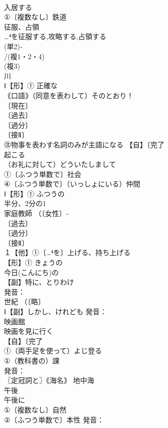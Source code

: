 \documentclass[8pt]{extreport}
\begin{document}
\begin{CJK}{UTF8}{min}
\\	入居する 
\\	①〔複数なし〕鉄道 
\\	征服、占領 
\\	…⁴を征服する,攻略する,占領する
\\	(単2)‐
\\	/(複1・2・4)
\\	(複3)
\\	川 
\\	Ⅰ【形】① 正確な 
\\	｟口語｠（同意を表わして）そのとおり！
\\	〔現在〕
\\	〔過去〕
\\	〔過分〕
\\	〔接Ⅱ〕
\\	㊟物事を表わす名詞のみが主語になる 【自】〔完了
\\	起こる 
\\	（お礼に対して）どういたしまして
\\	①〔ふつう単数で〕社会 
\\	④〔ふつう単数で〕（いっしょにいる）仲間
\\	Ⅰ【形】① ふつうの 
\\	半分、2分の1 
\\	家庭教師 （〔女性〕‐
\\	〔過去〕
\\	〔過分〕
\\	〔接Ⅱ〕
\\	１【他】①〔…⁴を〕上げる、持ち上げる 
\\	【形】① きょうの　　
\\	今日(こんにち)の
\\	【副】特に、とりわけ 
\\	発音：
\\	世紀 （〔略〕
\\	Ⅰ【副】しかし、けれども 発音：
\\	映画館 
\\	映画を見に行く
\\	【自】〔完了
\\	①（両手足を使って）よじ登る 
\\	①（教科書の）課 
\\	発音：
\\	〖定冠詞と〗｟海名｠ 地中海
\\	午後 
\\	午後に
\\	①〔複数なし〕自然 
\\	②〔ふつう単数で〕本性 発音：

\end{CJK}
\end{document}
